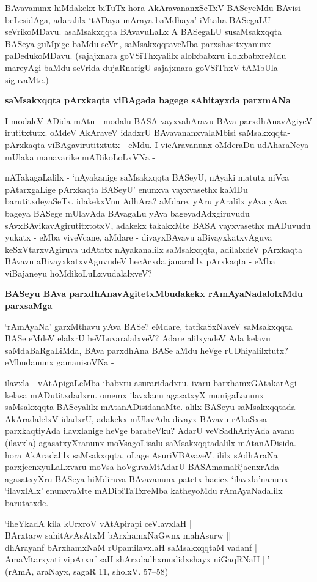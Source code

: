 BAvavanunx hiMdakekx biTuTx hora AkAravananxSeTxV BASeyeMdu BAvisi beLesidAga, adaralilx `tADaya mAraya baMdhaya' iMtaha BASegaLU seVrikoMDavu. asaMsakxqqta BAvavuLaLx A BASegaLU susaMsakxqqta BASeya guMpige baMdu seVri, saMsakxqqtaveMba parxshasitxyanunx paDedukoMDavu. (sajajxnara goVSiThxyalilx alolxbabxru ilolxbabxreMdu mareyAgi baMdu seVrida dujaRnarigU sajajxnara goVSiThxV-tAMbUla siguvaMte.)

\noindent
\textbf{saMsakxqqta pArxkaqta viBAgada bagege sAhitayxda parxmANa}\label{page12}

I modaleV ADida mAtu - modalu BASA vayxvahAravu BAva parxdhAnavAgiyeV irutitxtutx. oMdeV AkAraveV idadxrU BAvavananxvalaMbisi saMsakxqqta-pArxkaqta viBAgavirutitxtutx - eMdu. I vicAravanunx oMderaDu udAharaNeya mUlaka manavarike mADikoLoLxVNa - 

nATakagaLalilx - `nAyakanige saMsakxqqta BASeyU, nAyaki matutx niVca pAtarxgaLige pArxkaqta BASeyU' enunxva vayxvasethx kaMDu barutitxdeyaSeTx. idakekxVnu AdhAra? aMdare, yAru yAralilx yAva yAva bageya BASege mUlavAda BAvagaLu yAva bageyadAdxgiruvudu sAvxBAvikavAgirutitxtotxV, adakekx takakxMte BASA vayxvasethx mADuvudu yukatx - eMba viveVcane, aMdare - divayxBAvavu aBivayxkatxvAguva keSxVtarxvAgiruva udAtatx nAyakanalilx saMsakxqqta, adilalxdeV pArxkaqta BAvavu aBivayxkatxvAguvudeV hecAcxda janaralilx pArxkaqta - eMba viBajaneyu hoMdikoLuLxvudalalxveV?

\noindent
\textbf{BASeyu BAva parxdhAnavAgitetxMbudakekx rAmAyaNadalolxMdu parxsaMga}\label{page13}

`rAmAyaNa' garxMthavu yAva BASe? eMdare, tatfkaSxNaveV saMsakxqqta BASe eMdeV elalxrU heVLuvaralalxveV? Adare alilxyadeV Ada kelavu saMdaBaRgaLiMda, BAva parxdhAna BASe aMdu heVge rUDhiyalilxtutx? eMbudanunx gamanisoVNa -

ilavxla - vAtApigaLeMba ibabxru asuraridadxru. ivaru barxhamxGAtakarAgi kelasa mADutitxdadxru. omemx ilavxlanu agasatxyX munigaLanunx saMsakxqqta BASeyalilx mAtanADisidanaMte. alilx BASeyu saMsakxqqtada AkAradalelxV idadxrU, adakekx mUlavAda divayx BAvavu rAkaSxsa parxkaqtiyAda ilavxlanige heVge barabeVku? AdarU veVSadhAriyAda avanu (ilavxla) agasatxyXranunx moVsagoLisalu saMsakxqqtadalilx mAtanADisida. hora AkAradalilx saMsakxqqta, oLage AsuriVBAvaveV. ililx sAdhAraNa parxjecnxyuLaLxvaru moVsa hoVguvaMtAdarU BASAmamaRjacnxrAda agasatxyXru BASeya hiMdiruva BAvavanunx patetx hacicx `ilavxla'nanunx `ilavxlAlx' enunxvaMte mADibiTaTxreMba katheyoMdu rAmAyaNadalilx barutatxde.

\noindent
\begin{shloka}
`iheYkadA kila kUrxroV vAtApirapi ceVlavxlaH |\\\label{13}
BArxtarw sahitAvAsAtxM bArxhamxNaGwnx mahAsurw ||\\

dhArayanf bArxhamxNaM rUpamilavxlaH saMsakxqqtaM vadanf |\\
AmaMtarxyati vipArxnf saH shArxdadhxmudidxshayx niGaqRNaH ||'\\
(rAmA, araNayx, sagaR 11, sholxV. 57--58)
\end{shloka}  

